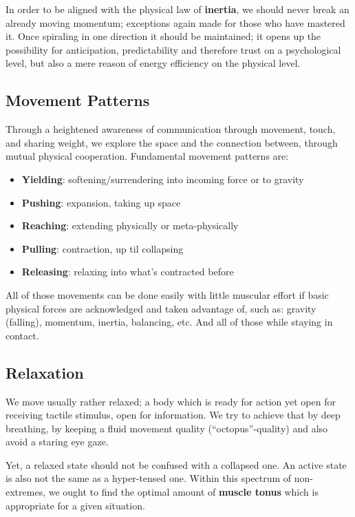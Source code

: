 In order to be aligned with the physical law of \textbf{inertia}, we should never break an already moving momentum; exceptions again made for those who have mastered it.
Once spiraling in one direction it should be maintained; it opens up the possibility for anticipation, predictability and therefore trust on a psychological level, but also a mere reason of energy efficiency on the physical level.

\subsection{Movement Patterns}\label{subsec:movement-patterns}

Through a heightened awareness of communication through movement, touch, and sharing weight, we explore the space and the connection between, through mutual physical cooperation.
Fundamental movement patterns are:

\begin{itemize}
    \item [] \textbf{Yielding}: softening/surrendering into incoming force or to gravity
    \item [] \textbf{Pushing}: expansion, taking up space
    \item [] \textbf{Reaching}: extending physically or meta-physically
    \item [] \textbf{Pulling}: contraction, up til collapsing
    \item [] \textbf{Releasing}: relaxing into what's contracted before
\end{itemize}

All of those movements can be done easily with little muscular effort if basic physical forces are acknowledged and taken advantage of, such as: gravity (falling), momentum, inertia, balancing, etc.
And all of those while staying in contact.

\subsection{Relaxation}\label{subsec:relaxation}

We move usually rather relaxed; a body which is ready for action yet open for receiving tactile stimulus, open for information.
We try to achieve that by deep breathing, by keeping a fluid movement quality (``octopus''-quality) and also avoid a staring eye gaze.

Yet, a relaxed state should not be confused with a collapsed one.
An active state is also not the same as a hyper-tensed one.
Within this spectrum of non-extremes, we ought to find the optimal amount of \textbf{muscle tonus} which is appropriate for a given situation.
